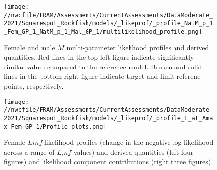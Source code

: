 \documentclass[11pt,
  english,
  a4paper,
]{article}
\begin{document}
\tagmcend\tagstructend


\begin{figure}
\centering
\texttt{[image: //nwcfile/FRAM/Assessments/CurrentAssessments/DataModerate\_2021/Squarespot\_Rockfish/models/\_likeprof/\_profile\_NatM\_p\_1\_Fem\_GP\_1\_NatM\_p\_1\_Mal\_GP\_1/multilikelihood\_profile.png]}
\caption{Female and male {\(M\)\leavevmode\tagmcend\tagstructend} multi-parameter likelihood profiles and derived quantities. Red lines in the top left figure indicate significantly similar values compared to the reference model. Broken and solid lines in the bottom right figure indicate target and limit referene points, respectively.\label{fig:M-multiprofile-combo}}
\end{figure}

\tagmcend\tagstructend


\begin{figure}
\centering
\texttt{[image: //nwcfile/FRAM/Assessments/CurrentAssessments/DataModerate\_2021/Squarespot\_Rockfish/models/\_likeprof/\_profile\_L\_at\_Amax\_Fem\_GP\_1/Profile\_plots.png]}
\caption{Female {\(Linf\)\leavevmode\tagmcend\tagstructend} likelihood profiles (change in the negative log-likelihood across a range of {\(L_inf\)\leavevmode\tagmcend\tagstructend} values) and derived quantities (left four figures) and likelihood component contributions (right three figures).\label{fig:Linf_F-profile-combo}}
\end{figure}

\tagmcend\tagstructend

\end{document}
